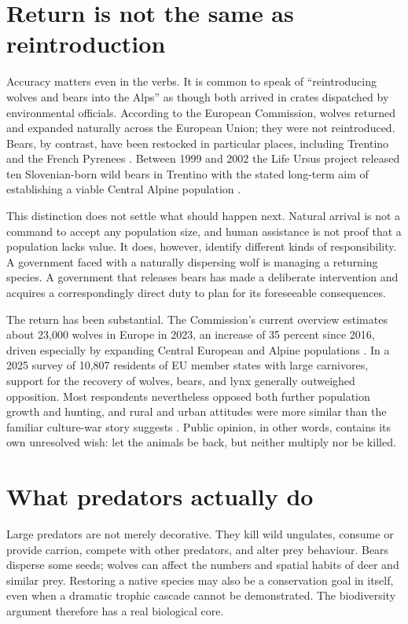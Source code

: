 ﻿\documentclass[12pt,a4paper]{book}
\begin{document}
\section{Return is not the same as reintroduction}

Accuracy matters even in the verbs.  It is common to speak of ``reintroducing
wolves and bears into the Alps'' as though both arrived in crates dispatched
by environmental officials.  According to the European Commission, wolves
returned and expanded naturally across the European Union; they were not
reintroduced.  Bears, by contrast, have been restocked in particular places,
including Trentino and the French Pyrenees
\cite{ECLargeCarnivoreFacts2026}.  Between 1999 and 2002 the Life Ursus project
released ten Slovenian-born wild bears in Trentino with the stated long-term
aim of establishing a viable Central Alpine population
\cite{TrentinoLifeUrsus}.

This distinction does not settle what should happen next.  Natural arrival is
not a command to accept any population size, and human assistance is not proof
that a population lacks value.  It does, however, identify different kinds of
responsibility.  A government faced with a naturally dispersing wolf is
managing a returning species.  A government that releases bears has made a
deliberate intervention and acquires a correspondingly direct duty to plan for
its foreseeable consequences.

The return has been substantial.  The Commission's current overview estimates
about 23,000 wolves in Europe in 2023, an increase of 35 percent since 2016,
driven especially by expanding Central European and Alpine populations
\cite{ECLargeCarnivoreFacts2026}.  In a 2025 survey of 10,807 residents of EU
member states with large carnivores, support for the recovery of wolves, bears,
and lynx generally outweighed opposition.  Most respondents nevertheless
opposed both further population growth and hunting, and rural and urban
attitudes were more similar than the familiar culture-war story suggests
\cite{ChapronCarnivoreOpinion2026}.  Public opinion, in other words, contains
its own unresolved wish: let the animals be back, but neither multiply nor be
killed.

\section{What predators actually do}

Large predators are not merely decorative.  They kill wild ungulates, consume
or provide carrion, compete with other predators, and alter prey behaviour.
Bears disperse some seeds; wolves can affect the numbers and spatial habits of
deer and similar prey.  Restoring a native species may also be a conservation
goal in itself, even when a dramatic trophic cascade cannot be demonstrated.
The biodiversity argument therefore has a real biological core.
\end{document}
